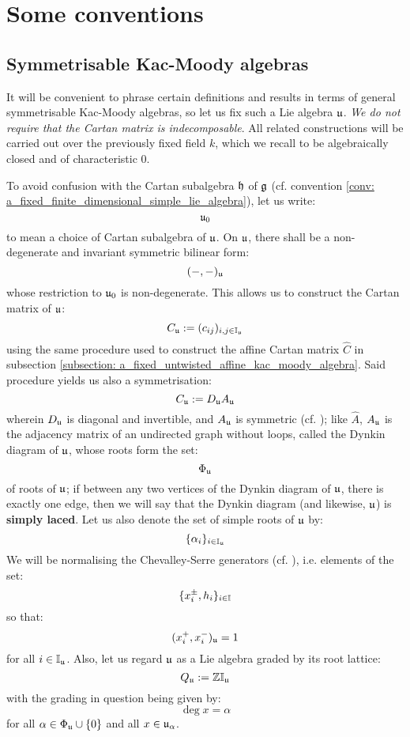 \section{Some conventions}
    \subsection{Symmetrisable Kac-Moody algebras} \label{subection: a_fixed_symmetrisable_kac_moody_algebra}
        It will be convenient to phrase certain definitions and results in terms of general symmetrisable Kac-Moody algebras, so let us fix such a Lie algebra $\mathfrak{u}$. \textit{We do not require that the Cartan matrix is indecomposable}. All related constructions will be carried out over the previously fixed field $k$, which we recall to be algebraically closed and of characteristic $0$. 

        To avoid confusion with the Cartan subalgebra $\mathfrak{h}$ of $\mathfrak{g}$ (cf. convention \ref{conv: a_fixed_finite_dimensional_simple_lie_algebra}), let us write:
            $$\mathfrak{u}_0$$
        to mean a choice of Cartan subalgebra of $\mathfrak{u}$. On $\mathfrak{u}$, there shall be a non-degenerate and invariant symmetric bilinear form:
            $$(-, -)_{\mathfrak{u}}$$
        whose restriction to $\mathfrak{u}_0$ is non-degenerate. This allows us to construct the Cartan matrix of $\mathfrak{u}$:
            $$C_{\mathfrak{u}} := (c_{ij})_{i, j \in \mathbb{I}_{\mathfrak{u}}}$$
        using the same procedure used to construct the affine Cartan matrix $\hat{C}$ in subsection \ref{subsection: a_fixed_untwisted_affine_kac_moody_algebra}. Said procedure yields us also a symmetrisation:
            $$C_{\mathfrak{u}} := D_{\mathfrak{u}} A_{\mathfrak{u}}$$
        wherein $D_{\mathfrak{u}}$ is diagonal and invertible, and $A_{\mathfrak{u}}$ is symmetric (cf. \cite[Chapter 2]{kac_infinite_dimensional_lie_algebras}); like $\hat{A}$, $A_{\mathfrak{u}}$ is the adjacency matrix of an undirected graph without loops, called the Dynkin diagram of $\mathfrak{u}$, whose roots form the set:
            $$\Phi_{\mathfrak{u}}$$
        of roots of $\mathfrak{u}$; if between any two vertices of the Dynkin diagram of $\mathfrak{u}$, there is exactly one edge, then we will say that the Dynkin diagram (and likewise, $\mathfrak{u}$) is \textbf{simply laced}. Let us also denote the set of simple roots of $\mathfrak{u}$ by:
            $$\{\alpha_i\}_{i \in \mathbb{I}_{\mathfrak{u}}}$$
        We will be normalising the Chevalley-Serre generators (cf. \cite[Theorem 1.4]{kac_infinite_dimensional_lie_algebras}), i.e. elements of the set:
            $$\{x_i^{\pm}, h_i\}_{i \in \mathbb{I}}$$
        so that:
            $$(x_i^+, x_i^-)_{\mathfrak{u}} = 1$$
        for all $i \in \mathbb{I}_{\mathfrak{u}}$. Also, let us regard $\mathfrak{u}$ as a Lie algebra graded by its root lattice:
            $$Q_{\mathfrak{u}} := \mathbb{Z}\mathbb{I}_{\mathfrak{u}}$$
        with the grading in question being given by:
            $$\deg x = \alpha$$
        for all $\alpha \in \Phi_{\mathfrak{u}} \cup \{0\}$ and all $x \in \mathfrak{u}_{\alpha}$.
        
